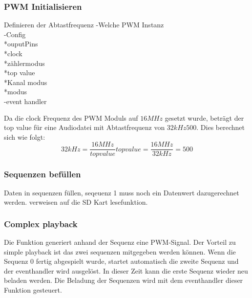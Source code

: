 \subsubsection*{PWM Initialisieren}\label{sec:PWM initialisieren}
Definieren der Abtastfrequenz
-Welche PWM Instanz\\
-Config\\
	*ouputPins\\
	*clock\\
	*zählermodus\\
	*top value\\
	*Kanal modus\\
	*modus\\
-event handler

Da die clock Frequenz des PWM Moduls auf $16MHz$ gesetzt wurde, beträgt der top value für eine Audiodatei mit Abtastfrequenz von $32kHz 500$. Dies berechnet sich wie folgt:
\begin{equation}
32kHz = \frac{16MHz}{top value}
top value = \frac{16MHz}{32kHz} = 500
\end{equation}

\subsubsection*{Sequenzen befüllen}\label{sec:Sequenzen befüllen}
Daten in sequenzen füllen, seqeuenz 1 muss noch ein Datenwert dazugerechnet werden. verweisen auf die SD Kart lesefunktion.

\subsubsection*{Complex playback}\label{sec:Complex playback}
Die Funktion generiert anhand der Sequenz eine PWM-Signal. Der
Vorteil zu simple playback ist das zwei sequenzen mitgegeben werden können. Wenn die Sequenz 0 fertig abgespielt wurde, startet automatisch die zweite Sequenz und der eventhandler wird ausgelöst. In dieser Zeit kann die erste Sequenz wieder neu beladen werden. Die Beladung der Sequenzen wird mit dem eventhandler dieser Funktion gesteuert. 

